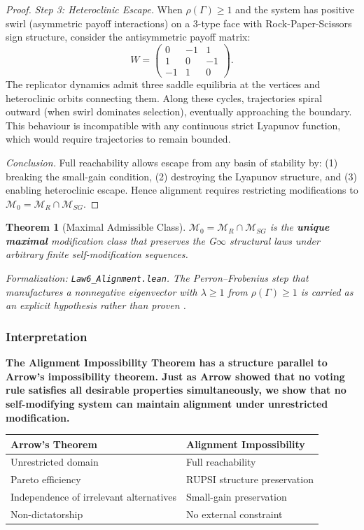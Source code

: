 \documentclass[12pt]{article}
\newtheorem{theorem}{Theorem}[section]
\newcommand{\added}[1]{\textbf{#1}}
\begin{document}
\begin{proof}
\textit{Step 3: Heteroclinic Escape.}
When $\rho(\Gamma) \geq 1$ and the system has positive swirl (asymmetric payoff interactions) on a 3-type face with Rock-Paper-Scissors sign structure, consider the antisymmetric payoff matrix:
\[
W = \begin{pmatrix} 0 & -1 & 1 \\ 1 & 0 & -1 \\ -1 & 1 & 0 \end{pmatrix}.
\]
The replicator dynamics admit three saddle equilibria at the vertices and heteroclinic orbits connecting them. Along these cycles, trajectories spiral outward (when swirl dominates selection), eventually approaching the boundary. This behaviour is incompatible with any continuous strict Lyapunov function, which would require trajectories to remain bounded.

\textit{Conclusion.}
Full reachability allows escape from any basin of stability by: (1) breaking the small-gain condition, (2) destroying the Lyapunov structure, and (3) enabling heteroclinic escape. Hence alignment requires restricting modifications to $\mathcal{M}_0 = \mathcal{M}_R \cap \mathcal{M}_{SG}$.
\end{proof}

\begin{theorem}[Maximal Admissible Class]
\label{thm:maximal-admissible}
$\mathcal{M}_0 = \mathcal{M}_R \cap \mathcal{M}_{SG}$ is the \textbf{unique maximal} modification class that preserves the G$\infty$ structural laws under arbitrary finite self-modification sequences.
\end{theorem}
\noindent\textit{Formalization: \texttt{Law6\_Alignment.lean}. The Perron--Frobenius step that manufactures a nonnegative eigenvector with $\lambda \geq 1$ from $\rho(\Gamma) \geq 1$ is carried as an explicit hypothesis rather than proven \citep{horn2012matrix}.}

\subsubsection{Interpretation}

\added{\textbf{The Alignment Impossibility Theorem has a structure parallel to Arrow's impossibility theorem. Just as Arrow showed that no voting rule satisfies all desirable properties simultaneously, we show that no self-modifying system can maintain alignment under unrestricted modification.}}

\begin{center}
\begin{tabular}{ll}
\toprule
\textbf{Arrow's Theorem} & \textbf{Alignment Impossibility} \\
\midrule
Unrestricted domain & Full reachability \\
Pareto efficiency & RUPSI structure preservation \\
Independence of irrelevant alternatives & Small-gain preservation \\
Non-dictatorship & No external constraint \\
\bottomrule
\end{tabular}
\end{center}
\end{document}
